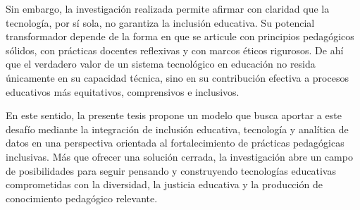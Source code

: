\begin{refsection}
Sin embargo, la investigación realizada permite afirmar con claridad que la tecnología, por sí sola, no garantiza la inclusión educativa. Su potencial transformador depende de la forma en que se articule con principios pedagógicos sólidos, con prácticas docentes reflexivas y con marcos éticos rigurosos. De ahí que el verdadero valor de un sistema tecnológico en educación no resida únicamente en su capacidad técnica, sino en su contribución efectiva a procesos educativos más equitativos, comprensivos e inclusivos.

En este sentido, la presente tesis propone un modelo que busca aportar a este desafío mediante la integración de inclusión educativa, tecnología y analítica de datos en una perspectiva orientada al fortalecimiento de prácticas pedagógicas inclusivas. Más que ofrecer una solución cerrada, la investigación abre un campo de posibilidades para seguir pensando y construyendo tecnologías educativas comprometidas con la diversidad, la justicia educativa y la producción de conocimiento pedagógico relevante.

\printbibliography[heading=subbibliography,title={Referencias (Capítulo VII)}]

\end{refsection}